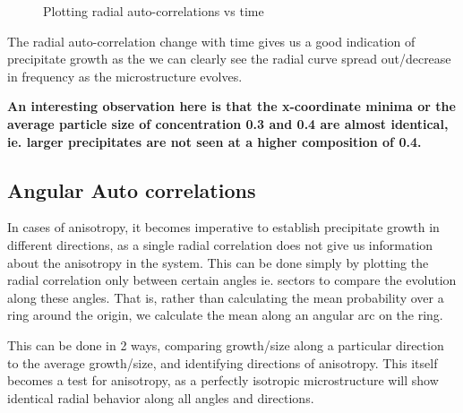 \documentclass[12pt, a4paper]{report}
\begin{document}
\begin{figure}[H]
\caption{Plotting radial auto-correlations vs time}
\label{fig:unexplainablePlot}
\end{figure}

The radial auto-correlation change with time gives us a good indication of precipitate growth as the we can clearly see the radial curve spread out/decrease in frequency as the microstructure evolves.

\textbf{An interesting observation here is that the x-coordinate minima or the average particle size of concentration 0.3 and 0.4 are almost identical, ie. larger precipitates are not seen at a higher composition of 0.4.}

\subsection{Angular Auto correlations}
In cases of anisotropy, it becomes imperative to establish precipitate growth in different directions, as a single radial correlation does not give us information about the anisotropy in the system. This can be done simply by plotting the radial correlation only between certain angles ie. sectors to compare the evolution along these angles. That is, rather than calculating the mean probability over a ring around the origin, we calculate the mean along an angular arc on the ring. 

This can be done in 2 ways, comparing growth/size along a particular direction to the average growth/size, and identifying directions of anisotropy. This itself becomes a test for anisotropy, as a perfectly isotropic microstructure will show identical radial behavior along all angles and directions.
\end{document}

